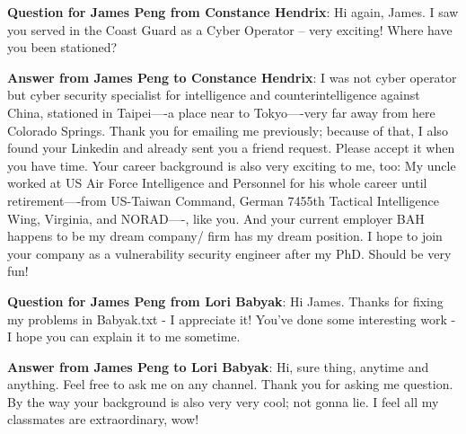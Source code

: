 \textbf{Question for James Peng from Constance Hendrix}:  Hi again, James.  I saw you served in the Coast Guard as a Cyber Operator -- very exciting!  Where have you been stationed?

\textbf{Answer from James Peng to Constance Hendrix}:  I was not cyber operator but cyber security specialist for intelligence and counterintelligence against China, stationed in Taipei----a place near to Tokyo----very far away from here Colorado Springs. Thank you for emailing me previously; because of that, I also found your Linkedin and already sent you a friend request. Please accept it when you have time. Your career background is also very exciting to me, too: My uncle worked at US Air Force Intelligence and Personnel for his whole career until retirement----from US-Taiwan Command, German 7455th Tactical Intelligence Wing, Virginia, and NORAD----, like you. And your current employer BAH happens to be my dream company/ firm has my dream position. I hope to join your company as a vulnerability security engineer after my PhD. Should be very fun!   

\textbf{Question for James Peng from Lori Babyak}:  Hi James. Thanks for fixing my problems in Babyak.txt - I appreciate it!  You've done some interesting work - I hope you can explain it to me sometime.

\textbf{Answer from James Peng to Lori Babyak}:  Hi, sure thing, anytime and anything. Feel free to ask me on any channel. Thank you for asking me question. By the way your background is also very very cool; not gonna lie. I feel all my classmates are extraordinary, wow!
